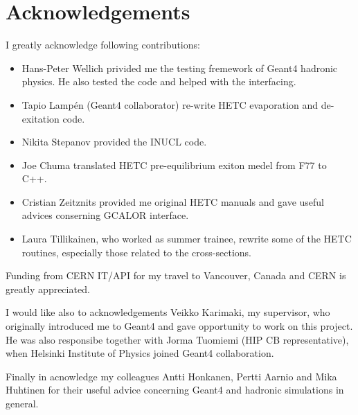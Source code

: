 
\section{Acknowledgements}

I greatly acknowledge following contributions:

\begin{itemize}
\item Hans-Peter Wellich privided me the testing fremework of Geant4 hadronic physics. He also tested the code and helped with the interfacing.
\item Tapio Lamp\'{e}n (Geant4 collaborator) re-write HETC evaporation and de-exitation code.
\item Nikita Stepanov provided the INUCL code.
\item Joe Chuma translated HETC pre-equilibrium exiton medel from F77 to C++.
\item Cristian Zeitznits provided me original HETC manuals and gave useful advices conserning GCALOR interface.
\item Laura Tillikainen, who worked as summer trainee, rewrite some of the HETC routines, 
especially those related to the cross-sections.
\end{itemize}

Funding from CERN IT/API for my travel to Vancouver, Canada and CERN is greatly appreciated.

I would like also to acknowledgements Veikko Karimaki, my supervisor, 
who originally introduced me to Geant4 and gave opportunity to work on this project. 
He was also responsibe together with Jorma Tuomiemi (HIP CB representative), 
when Helsinki Institute of Physics joined Geant4 collaboration.


Finally in acnowledge my colleagues Antti Honkanen, Pertti Aarnio and Mika Huhtinen for their useful advice concerning Geant4 and hadronic simulations in general.
